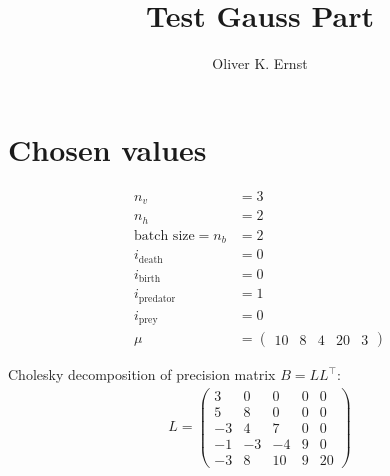 \documentclass[11pt]{article}
\title{Test Gauss Part}
\author{Oliver K. Ernst}
\begin{document}
\maketitle


\section{Chosen values}


\begin{equation}
\begin{split}
n_v &= 3 \\
n_h &= 2 \\
\text{batch size} = n_b &= 2 \\
i_\text{death} &= 0 \\
i_\text{birth} &= 0 \\
i_\text{predator} &= 1 \\
i_\text{prey} &= 0 \\
\mu &= \begin{pmatrix}
	10 & 8 & 4 & 20 & 3
\end{pmatrix}
\end{split}
\end{equation}

Cholesky decomposition of precision matrix $B = L L^\intercal$:
\begin{equation}
\begin{split}
L = \begin{pmatrix}
	3 & 0 & 0 & 0 & 0 \\
	5 & 8 & 0 & 0 & 0 \\
	-3 & 4 & 7 & 0 & 0 \\
	-1 & -3 & -4 & 9 & 0 \\
	-3 & 8 & 10 & 9 & 20
\end{pmatrix}
\end{split}
\end{equation}

\end{document}

